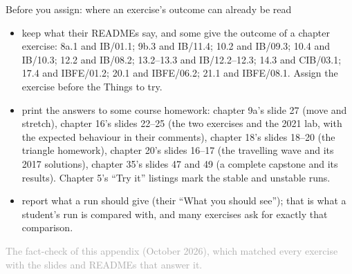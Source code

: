 \documentclass[aspectratio=169,11pt]{beamer}
\newcommand{\sourcecredit}[1]{\vfill\begin{flushright}\tiny\textcolor{DarkGray}{#1}\end{flushright}}
\begin{document}
\begin{frame}{Before you assign: where an exercise's outcome can already be read}
\label{fr:assign}
\footnotesize
\begin{itemize}\setlength{\itemsep}{3pt}
  \item {} keep what their READMEs say, and some give the outcome of a chapter exercise: 8a.1 and IB/01.1; 9b.3 and IB/11.4; 10.2 and IB/09.3; 10.4 and IB/10.3; 12.2 and IB/08.2; 13.2--13.3 and IB/12.2--12.3; 14.3 and CIB/03.1; 17.4 and IBFE/01.2; 20.1 and IBFE/06.2; 21.1 and IBFE/08.1. Assign the exercise before the Things to try.
  \item {} print the answers to some course homework: chapter 9a's slide 27 (move and stretch), chapter 16's slides 22--25 (the two exercises and the 2021 lab, with the expected behaviour in their comments), chapter 18's slides 18--20 (the triangle homework), chapter 20's slides 16--17 (the travelling wave and its 2017 solutions), chapter 35's slides 47 and 49 (a complete capstone and its results). Chapter 5's ``Try it'' listings mark the stable and unstable runs.
  \item {} report what a run should give (their ``What you should see''); that is what a student's run is compared with, and many exercises ask for exactly that comparison.
\end{itemize}
\sourcecredit{The fact-check of this appendix (October 2026), which matched every exercise with the slides and READMEs that answer it.}
\end{frame}
\end{document}
